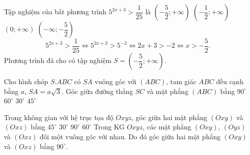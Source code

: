 \begin{ex}%
Tập nghiệm của bất phương trình $5^{2x+3}>\dfrac{1}{25}$ là
\choice 
{\True $\left (-\dfrac{5}{2};+\infty  \right )$} 
{$\left (-\dfrac{1}{2};+\infty  \right )$}
{$(0;+\infty )$} 
{$\left (-\infty ;-\dfrac{5}{2} \right )$}
\loigiai
{
$$5^{2x+3}>\dfrac{1}{25}\Leftrightarrow 5^{2x+3}>5^{-2}\Leftrightarrow 2x+3>-2\Leftrightarrow x>-\dfrac{5}{2}.$$
Phương trình đã cho có tập nghiệm $S=\left (-\dfrac{5}{2};+\infty  \right )$.
}
\end{ex}

\begin{ex}%
Cho hình chóp $S.ABC$ có $SA$ vuông góc với $(ABC)$, tam giác $ABC$ đều cạnh bằng $a$, $SA=a\sqrt{3}$. Góc giữa đường thẳng $SC$ và mặt phẳng $(ABC)$ bằng
\choice 
{$90^{\circ}$} 
{\True $60^{\circ}$}
{$30^{\circ}$} 
{$45^{\circ}$}
\loigiai
{
}
\end{ex}

\begin{ex}%
Trong không gian với hệ trục tọa độ $Oxyz$, góc giữa hai mặt phẳng $(Oxy)$ và $(Oxz)$ bằng
\choice 
{$45^{\circ}$} 
{$30^{\circ}$}
{\True $90^{\circ}$} 
{$60^{\circ}$}
\loigiai
{
Trong KG $Oxyz$, các mặt phẳng $(Oxy)$, $(Oyz)$ và $(Oxz)$ đôi một vuông góc với nhau. Do đó góc giữa hai mặt phẳng $(Oxy)$ và $(Oxz)$ bằng $90^{\circ}$.
}
\end{ex}

